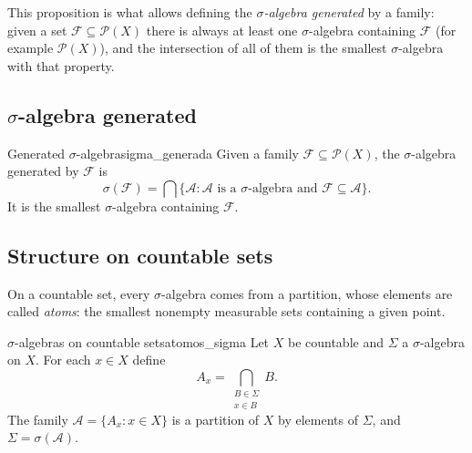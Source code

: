 \documentclass[11pt, a4paper]{article}
\begin{document}
\obs This proposition is what allows defining the \emph{$\sigma$-algebra generated} by a
family: given a set $\mathcal{F} \subseteq \mathcal{P}(X)$ there is always at least one
$\sigma$-algebra containing $\mathcal{F}$ (for example $\mathcal{P}(X)$), and the intersection
of all of them is the smallest $\sigma$-algebra with that property.

\subsection{\texorpdfstring{$\sigma$}{σ}-algebra generated}

\begin{definicion}{Generated $\sigma$-algebra}{sigma_generada}
Given a family $\mathcal{F} \subseteq \mathcal{P}(X)$, the $\sigma$-algebra generated by
$\mathcal{F}$ is
$$ \sigma(\mathcal{F}) = \bigcap \{ \mathcal{A} : \mathcal{A} \text{ is a }\sigma\text{-algebra and }
\mathcal{F} \subseteq \mathcal{A} \}. $$
It is the smallest $\sigma$-algebra containing $\mathcal{F}$.
\end{definicion}

\subsection{Structure on countable sets}

On a countable set, every $\sigma$-algebra comes from a partition, whose elements
are called \emph{atoms}: the smallest nonempty measurable sets containing a given point.

\begin{teorema}{$\sigma$-algebras on countable sets}{atomos_sigma}
Let $X$ be countable and $\Sigma$ a $\sigma$-algebra on $X$. For each $x \in X$ define
$$ A_x = \bigcap_{\substack{B \in \Sigma \\ x \in B}} B. $$
The family $\mathcal{A} = \{A_x : x \in X\}$ is a partition of $X$ by elements of $\Sigma$,
and $\Sigma = \sigma(\mathcal{A})$.
\end{teorema}
\end{document}
